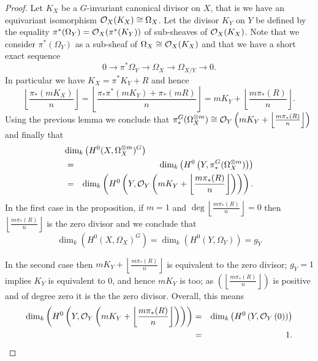 \documentclass[11pt]{article} %
\newcommand{\cO}{{\cal O}}
\begin{document}
  \begin{proof}
    Let $K_X$ be a $G$-invariant canonical divisor on $X$, that is we have an equivariant isomorphism $\cO_X(K_X)\cong \Omega_X$. 
    Let the divisor $K_Y$ on $Y$ be defined by the equality $\pi^*(\Omega_Y) = \cO_X(\pi^*(K_Y))$ of sub-sheaves of $\cO_X(K_X)$. 
    Note that we consider $\pi^*(\Omega_Y)$ as a sub-sheaf of $\Omega_X \cong \cO_X(K_X)$ and that we have a short exact sequence
      \[0 \rightarrow \pi^* \Omega_Y \rightarrow \Omega_X \rightarrow \Omega_{X/Y} \rightarrow 0. \]
    In particular we have $K_X = \pi^* K_Y + R$ and hence
      \[\left\lfloor \frac{\pi_*(mK_X)}{n} \right \rfloor = 
      \left \lfloor \frac{\pi_*\pi^*(mK_Y) + \pi_*(mR)}{n} \right \rfloor =
      mK_Y + \left \lfloor \frac{m\pi_*(R)}{n} \right\rfloor.\]
    Using the previous lemma we conclude that $\pi_*^G(\Omega_X^{\otimes m}) \cong \cO_Y\left(mK_Y + \left \lfloor \frac{m\pi_*(R)}{n}\right\rfloor\right)$ and finally that
      \begin{eqnarray*}
	\lefteqn{\textrm{dim}_k \left(H^0(X,\Omega_X^{\otimes m})^G \right)}\\
	& = & \textrm{dim}_k \left(H^0\left(Y, \pi_*^G(\Omega_X^{\otimes m})\right)\right) \\
	 & = & \textrm{dim}_k \left(H^0\left(Y, \cO_Y\left(mK_Y+ \left\lfloor \frac{m\pi_*(R)}{n}\right\rfloor \right) \right) \right).
      \end{eqnarray*}
  In the first case in the proposition, if $m=1$ and $\deg \left\lfloor\frac{m\pi_*(R)}{n} \right\rfloor=0$ then $\left\lfloor\frac{m\pi_*(R)}{n} \right\rfloor$ is the zero divisor and we conclude that 
    \begin{equation*}
	\dim_k\left(H^0(X,\Omega_X)^G\right) = \dim_k\left(H^0(Y, \Omega_Y)\right) = g_Y
    \end{equation*}


  In the second case then $mK_Y+\left\lfloor \frac{m\pi_*(R)}{n} \right\rfloor$ is equivalent to the zero divisor; 
  $g_Y=1$ implies $K_Y$ is equivalent to $0$, and hence $mK_Y$ is too; 
  as $\left( \left\lfloor \frac{m\pi_*(R)}{n} \right\rfloor \right)$ is positive and of degree zero it is the the zero divisor. 
  Overall, this means
    \begin{eqnarray*}
      \dim_k\left( H^0\left( Y,\cO_Y\left( mK_Y+\left\lfloor \frac{m\pi_*(R)}{n} \right\rfloor \right) \right) \right) & = & \dim_k \left( H^0\left( Y,\cO_Y\left( 0 \right) \right) \right)\\
      & = & 1.
    \end{eqnarray*}



\end{proof}
\end{document}
